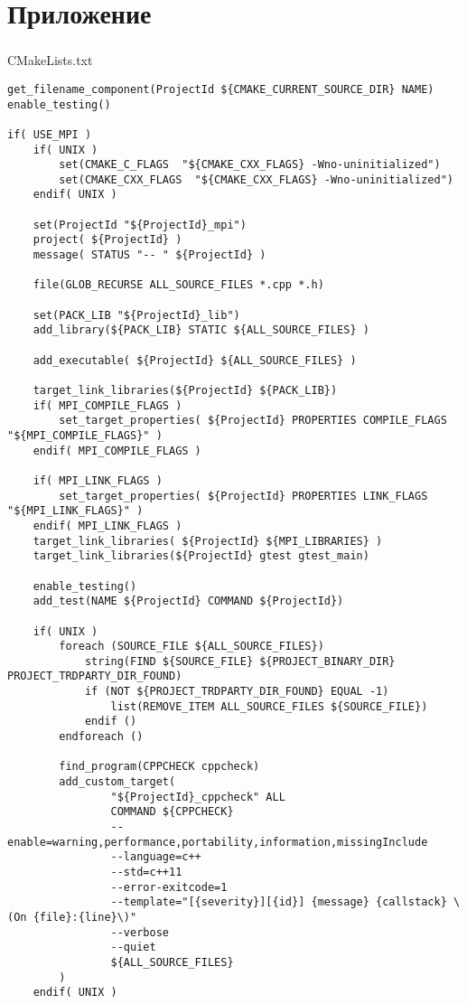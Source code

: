 \documentclass[12pt,a4paper]{article}
\begin{document}
\part*{Приложение}
\section{}CMakeLists.txt
\begin{lstlisting}
get_filename_component(ProjectId ${CMAKE_CURRENT_SOURCE_DIR} NAME)
enable_testing()

if( USE_MPI )
    if( UNIX )
        set(CMAKE_C_FLAGS  "${CMAKE_CXX_FLAGS} -Wno-uninitialized")
        set(CMAKE_CXX_FLAGS  "${CMAKE_CXX_FLAGS} -Wno-uninitialized")
    endif( UNIX )

    set(ProjectId "${ProjectId}_mpi")
    project( ${ProjectId} )
    message( STATUS "-- " ${ProjectId} )

    file(GLOB_RECURSE ALL_SOURCE_FILES *.cpp *.h)

    set(PACK_LIB "${ProjectId}_lib")
    add_library(${PACK_LIB} STATIC ${ALL_SOURCE_FILES} )

    add_executable( ${ProjectId} ${ALL_SOURCE_FILES} )

    target_link_libraries(${ProjectId} ${PACK_LIB})
    if( MPI_COMPILE_FLAGS )
        set_target_properties( ${ProjectId} PROPERTIES COMPILE_FLAGS "${MPI_COMPILE_FLAGS}" )
    endif( MPI_COMPILE_FLAGS )

    if( MPI_LINK_FLAGS )
        set_target_properties( ${ProjectId} PROPERTIES LINK_FLAGS "${MPI_LINK_FLAGS}" )
    endif( MPI_LINK_FLAGS )
    target_link_libraries( ${ProjectId} ${MPI_LIBRARIES} )
    target_link_libraries(${ProjectId} gtest gtest_main)

    enable_testing()
    add_test(NAME ${ProjectId} COMMAND ${ProjectId})

    if( UNIX )
        foreach (SOURCE_FILE ${ALL_SOURCE_FILES})
            string(FIND ${SOURCE_FILE} ${PROJECT_BINARY_DIR} PROJECT_TRDPARTY_DIR_FOUND)
            if (NOT ${PROJECT_TRDPARTY_DIR_FOUND} EQUAL -1)
                list(REMOVE_ITEM ALL_SOURCE_FILES ${SOURCE_FILE})
            endif ()
        endforeach ()

        find_program(CPPCHECK cppcheck)
        add_custom_target(
                "${ProjectId}_cppcheck" ALL
                COMMAND ${CPPCHECK}
                --enable=warning,performance,portability,information,missingInclude
                --language=c++
                --std=c++11
                --error-exitcode=1
                --template="[{severity}][{id}] {message} {callstack} \(On {file}:{line}\)"
                --verbose
                --quiet
                ${ALL_SOURCE_FILES}
        )
    endif( UNIX )


\end{lstlisting}
\end{document}
